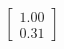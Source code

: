 \documentclass[preview]{standalone}
\begin{document}
\begin{align*}
\begin{bmatrix} 1.00 \\ 0.31 \end{bmatrix}
\end{align*}
\end{document}
